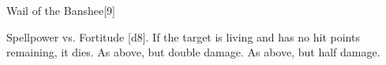\begin{spellsection}{Wail of the Banshee}[9]
    \begin{spellheader}
    \end{spellheader}
    \begin{spellcontent}
        \begin{spelltargetinginfo}
        \end{spelltargetinginfo}
        \begin{spelleffects}
            \begin{spellattack}{Spellpower vs. Fortitude}
                \spellsuccess {}[d8]. If the target is living and has no hit points remaining, it dies.
                \spellcritical As above, but double damage.
                \spellfailure As above, but half damage.
            \end{spellattack}
        \end{spelleffects}
    \end{spellcontent}
    \begin{spellfooter}
        \miscastexplode
    \end{spellfooter}
\end{spellsection}

